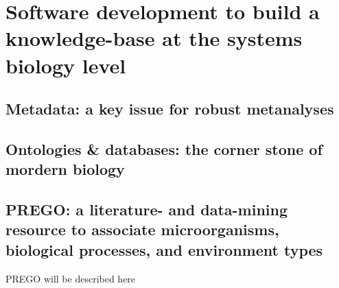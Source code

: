 % 
% 


\chapter{Software development to build a knowledge-base at the systems biology level}
\label{cha:prego}



\section{Metadata: a key issue for robust metanalyses}


\section{Ontologies \& databases: the corner stone of mordern biology}


\section{PREGO: a literature- and data-mining resource to associate microorganisms, biological processes, and environment types}




PREGO will be described here

